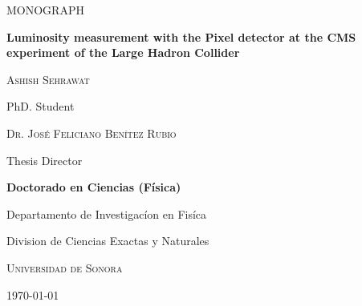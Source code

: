 \documentclass[final,3p]{CSP}
\def\Student{Ashish Sehrawat}
\def\Director{Dr. Jos\'{e} Feliciano Ben\'{i}tez Rubio}
\def\Title{MONOGRAPH}
\def\Prog{Doctorado en Ciencias (F\'{i}sica) }
\def\Dept{Departamento de Investigac\'{i}on en Fis\'{i}ca}
\def\Division{Division de Ciencias Exactas y Naturales}
\def\Universidad{Universidad de Sonora}
\def\ProjectTitle{Luminosity measurement with the Pixel detector at the CMS experiment of the Large Hadron Collider }
\def\ResearchLine{Astrof\'{i}sica, Cosmolog\'{i}a y F\'{i}sica de Part\'{i}culas}
\begin{document}
\begin{titlepage}
  \centering
  \hspace{0pt}
  \vfill
        {\scshape\Large \Title \par}

	\vspace{2cm}
            {\large \bf \ProjectTitle \par}


        
        \vspace{4cm}
	{\scshape\large \Student \par}
        {PhD. Student\par}

        \vspace{1cm}
	{\scshape \Director \par}
        {Thesis Director\par}

        \vspace{1cm}
        {\bf \Prog \par}
        {\Dept \par}
        {\Division \par}
        {\scshape \Universidad \par}

        \vspace{4cm}
	{\today}

\hspace{0pt}
\vfill

\end{titlepage}
\shipout\null

\newpage
\hspace{2pt}
\end{document}
